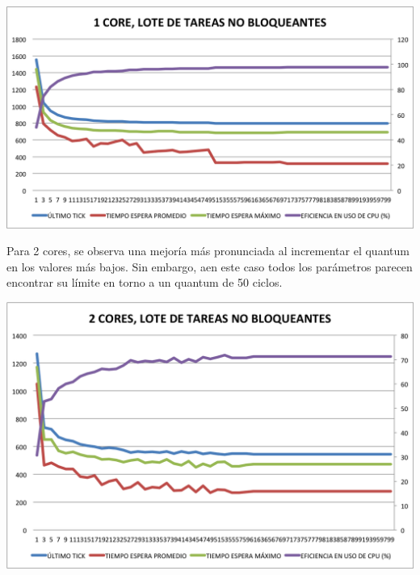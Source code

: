 \begin{center}
	\includegraphics[scale=0.4]{graficos/1core_loteNoBloqueante.png}
\end{center}

Para 2 cores, se observa una mejor\'ia m\'as pronunciada al incrementar el quantum en los valores m\'as bajos. Sin embargo, aen este caso todos los par\'ametros parecen encontrar su l\'imite en torno a un quantum de 50 ciclos.
\begin{center}
	\includegraphics[scale=0.4]{graficos/2cores_loteNoBloqueante.png}
\end{center}

